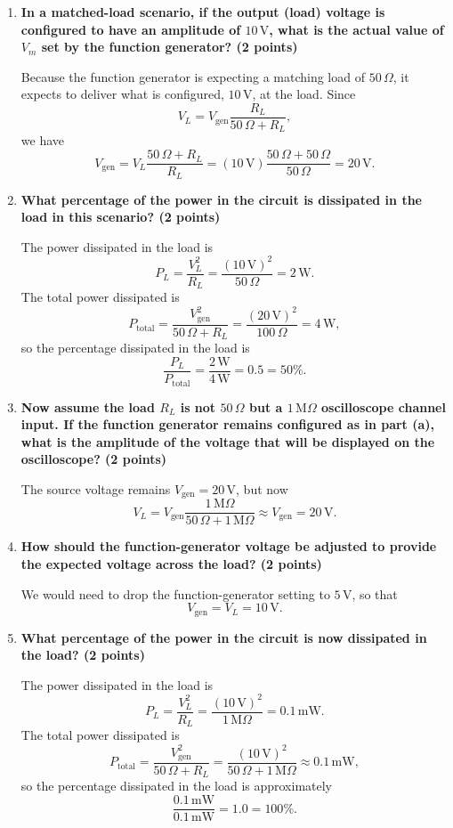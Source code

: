 \begin{enumerate}
\item[(a)] \textbf{In a matched-load scenario, if the output (load) voltage is configured
to have an amplitude of $10\,\mathrm{V}$, what is the actual value of $V_m$ set by the
function generator? (2 points)}

Because the function generator is expecting a matching load of $50\,\Omega$, it expects
to deliver what is configured, $10\,\mathrm{V}$, at the load. Since
\[
V_L = V_{\mathrm{gen}}\frac{R_L}{50\,\Omega + R_L},
\]
we have
\[
V_{\mathrm{gen}}
=V_L\frac{50\,\Omega+R_L}{R_L}
=(10\,\mathrm{V})\frac{50\,\Omega+50\,\Omega}{50\,\Omega}
=20\,\mathrm{V}.
\]

\item[(b)] \textbf{What percentage of the power in the circuit is dissipated in the load
in this scenario? (2 points)}

The power dissipated in the load is
\[
P_L=\frac{V_L^2}{R_L}
=\frac{(10\,\mathrm{V})^2}{50\,\Omega}
=2\,\mathrm{W}.
\]
The total power dissipated is
\[
P_{\mathrm{total}}
=\frac{V_{\mathrm{gen}}^2}{50\,\Omega+R_L}
=\frac{(20\,\mathrm{V})^2}{100\,\Omega}
=4\,\mathrm{W},
\]
so the percentage dissipated in the load is
\[
\frac{P_L}{P_{\mathrm{total}}}
=\frac{2\,\mathrm{W}}{4\,\mathrm{W}}
=0.5=50\%.
\]

\item[(c)] \textbf{Now assume the load $R_L$ is not $50\,\Omega$ but a
$1\,\mathrm{M}\Omega$ oscilloscope channel input. If the function generator remains
configured as in part (a), what is the amplitude of the voltage that will be displayed
on the oscilloscope? (2 points)}

The source voltage remains $V_{\mathrm{gen}}=20\,\mathrm{V}$, but now
\[
V_L
=V_{\mathrm{gen}}\frac{1\,\mathrm{M}\Omega}
{50\,\Omega+1\,\mathrm{M}\Omega}
\approx V_{\mathrm{gen}}
=20\,\mathrm{V}.
\]

\item[(d)] \textbf{How should the function-generator voltage be adjusted to provide the
expected voltage across the load? (2 points)}

We would need to drop the function-generator setting to $5\,\mathrm{V}$, so that
\[
V_{\mathrm{gen}}=V_L=10\,\mathrm{V}.
\]

\item[(e)] \textbf{What percentage of the power in the circuit is now dissipated in the
load? (2 points)}

The power dissipated in the load is
\[
P_L=\frac{V_L^2}{R_L}
=\frac{(10\,\mathrm{V})^2}{1\,\mathrm{M}\Omega}
=0.1\,\mathrm{mW}.
\]
The total power dissipated is
\[
P_{\mathrm{total}}
=\frac{V_{\mathrm{gen}}^2}{50\,\Omega+R_L}
=\frac{(10\,\mathrm{V})^2}{50\,\Omega+1\,\mathrm{M}\Omega}
\approx 0.1\,\mathrm{mW},
\]
so the percentage dissipated in the load is approximately
\[
\frac{0.1\,\mathrm{mW}}{0.1\,\mathrm{mW}}
=1.0=100\%.
\]


\end{enumerate}

